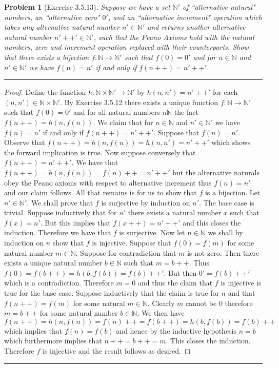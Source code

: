 \documentclass{article}
\newcommand{\lined}{\noindent\rule{\textwidth}{1pt}}
\newtheorem*{problem}{Problem}
\begin{document}
	\begin{problem}[Exercise 3.5.13]
		Suppose we have a set $\mathbb{N}'$ of ``alternative natural" numbers, an ``alternative  zero" $0'$, and an ``alternative increment"
		operation  which takes any alternative natural number $n' \in \mathbb{N}'$ and returns another alternative natural number $n'++' \in \mathbb{N}'$, such that the Peano Axioms hold with the natural numbers, zero and increment operation replaced with their counterparts. Show that there exists a bijection $f:\mathbb{N} \rightarrow \mathbb{N}'$ such that $f(0) = 0'$ and for $n \in \mathbb{N}$ and $n' \in \mathbb{N}'$ we have $f(n) = n'$ if and only if $f(n++) = n'++'$.
	\end{problem}
	
	\lined
		\begin{proof}
			Define the function $h: \mathbb{N} \times \mathbb{N}' \rightarrow \mathbb{N}'$ by 
			$h(n, n') = n'++'$ for each $(n,n') \in \mathbb{N} \times \mathbb{N}'$. By Exercise 3.5.12 there exists a unique function 
			$f:\mathbb{N} \rightarrow \mathbb{N}'$ such that $f(0) = 0'$ and for all natural numbers $n \mathbb{N}$ the fact $f(n++) = h(n,f(n))$. We claim that for $n \in \mathbb{N}$ and $n' \in \mathbb{N}'$ we have $f(n) = n'$ if and only if $f(n++) = n'++'$. Suppose that 
			$f(n) = n'$. Observe that $f(n++) = h(n,f(n)) = h(n,n') = n'++'$ which shows the forward implication is true. Now suppose conversely that $f(n++) = n'++'$. We have that $f(n++) = h(n,f(n)) = f(n)++ = n'++'$ but the alternative naturals obey the Peano axioms with respect to alternative increment thus $f(n) = n'$ and our claim follows. All that remains is for us to show that $f$ is a bijection. Let $n' \in \mathbb{N}'$. We shall prove that $f$ is surjective by induction on $n'$. The base case is trivial. Suppose inductively that for $n'$ there exists a natural number $x$ such that $f(x) = n'$. But this implies that 
			$f(x++) = n'++'$ and this closes the induction. Therefore we have that $f$ is surjective. Now let $n \in \mathbb{N}$ we shall by induction on $n$ show that $f$ is injective. Suppose that $f(0) = f(m)$ for some natural number $m \in \mathbb{N}$. Suppose for contradiction that $m$ is not zero. Then there exists a unique natural number $b \in \mathbb{N}$ such that $m = b++$. Thus $f(0) = f(b++) = h(b,f(b)) = 
			f(b)++'$. But then $0' = f(b)++'$ which is a contradiction. Therefore $m = 0$ and thus the claim that $f$ is injective is true for the base case. Suppose inductively that the claim is true for $n$ and that $f(n++) = f(m)$ for some natural $m \in \mathbb{N}$. Clearly $m$ cannot be $0$ therefore $m = b++$ for some natural number $b \in \mathbb{N}$. We then have $f(n++) = h(n,f(n)) = f(n)++ = f(b++) = 
			h(b,f(b)) = f(b)++$  which implies that $f(n) = f(b)$ and hence by the inductive hypothesis $n = b$ which furthermore implies that $n++ = b++ = m$. This closes the induction. Therefore $f$ is injective and the result follows as desired. 
		\end{proof}
	\lined
	
	
	
\end{document}
